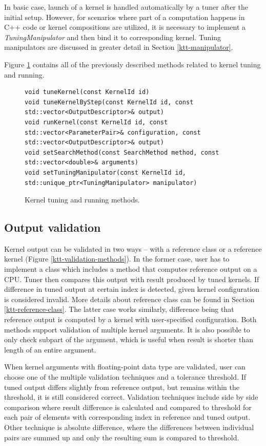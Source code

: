 \documentclass
[
    digital, %
    oneside, %
    table, %
    nolof, %
    nolot, %
    nocover %
]{fithesis3}
\begin{document}
In basic case, launch of a kernel is handled automatically by a tuner after the initial setup. However, for scenarios where part of a computation
happens in C++ code or kernel compositions are utilized, it is necessary to implement a \textit{TuningManipulator} and then bind it to corresponding
kernel. Tuning manipulators are discussed in greater detail in Section \ref{ktt-manipulator}.

Figure \ref{ktt-tuning-methods} contains all of the previously described methods related to kernel tuning and running.

\begin{figure}
\begin{adjustwidth}{-1cm}{-1cm}
\begin{lstlisting}
void tuneKernel(const KernelId id)
void tuneKernelByStep(const KernelId id, const std::vector<OutputDescriptor>& output)
void runKernel(const KernelId id, const std::vector<ParameterPair>& configuration, const std::vector<OutputDescriptor>& output)
void setSearchMethod(const SearchMethod method, const std::vector<double>& arguments)
void setTuningManipulator(const KernelId id, std::unique_ptr<TuningManipulator> manipulator)
\end{lstlisting}
\caption{Kernel tuning and running methods.}
\label{ktt-tuning-methods}
\end{adjustwidth}
\end{figure}

\subsection{Output validation}
\label{ktt-validation}
Kernel output can be validated in two ways -- with a reference class or a reference kernel (Figure \ref{ktt-validation-methods}). In the former case,
user has to implement a class which includes a method that computes reference output on a CPU. Tuner then compares this output with result produced
by tuned kernels. If difference in tuned output at certain index is detected, given kernel configuration is considered invalid. More details about
reference class can be found in Section \ref{ktt-reference-class}. The latter case works similarly, difference being that reference output is computed
by a kernel with user-specified configuration. Both methods support validation of multiple kernel arguments. It is also possible to only check subpart
of the argument, which is useful when result is shorter than length of an entire argument.

When kernel arguments with floating-point data type are validated, user can choose one of the multiple validation techniques and a tolerance threshold.
If tuned output differs slightly from reference output, but remains within the threshold, it is still considered correct. Validation techniques include
side by side comparison where result difference is calculated and compared to threshold for each pair of elements with corresponding index in reference
and tuned output. Other technique is absolute difference, where the differences between individual pairs are summed up and only the resulting sum is
compared to threshold.
\end{document}
